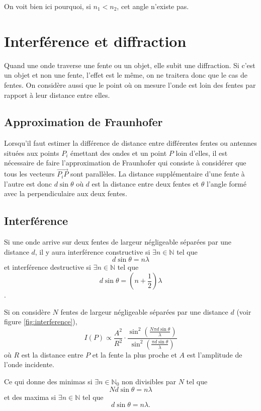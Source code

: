 On voit bien ici pourquoi, si $n_1 < n_2$, cet angle n'existe pas.

\section{Interférence et diffraction}
Quand une onde traverse une fente ou un objet, elle subit une diffraction.
Si c'est un objet et non une fente, l'effet est le même,
on ne traitera donc que le cas de fentes.
On considère aussi que le point où on mesure l'onde est loin des fentes
par rapport à leur distance entre elles.

\subsection{Approximation de Fraunhofer}
\label{sec:fraunhofer}
Lorsqu'il faut estimer la différence de distance entre différentes
fentes ou antennes situées aux points $P_i$ émettant des ondes
et un point $P$ loin d'elles,
il est nécessaire de faire l'approximation de Fraunhofer qui
consiste à considérer que tous les vecteurs $\vec{P_iP}$
sont parallèles.
La distance supplémentaire d'une fente à l'autre est donc $d\sin\theta$
où $d$ est la distance entre deux fentes et $\theta$ l'angle
formé avec la perpendiculaire aux deux fentes.

\subsection{Interférence}
Si une onde arrive sur deux fentes de largeur négligeable séparées par
une distance $d$,
il y aura interférence constructive si $\exists n \in \mathbb{N}$ tel que
\[ d\sin\theta = n \lambda \]
et interférence destructive si $\exists n \in \mathbb{N}$ tel que
\[ d\sin\theta = \left(n+\frac{1}{2}\right) \lambda \].

Si on considère $N$ fentes de largeur négligeable séparées par une
distance $d$ (voir figure \ref{fig:interference}),
\[ I(P) \propto \frac{A^2}{R^2} \cdot
  \frac{\sin^2\left(\frac{N \pi d \sin\theta}{\lambda}\right)}
{\sin^2\left(\frac{\pi d \sin\theta}{\lambda}\right)} \]
où $R$ est la distance entre $P$ et la fente la plus proche
et $A$ est l'amplitude de l'onde incidente.

Ce qui donne des minimas si
$\exists n \in \mathbb{N}_0$ non divisibles par $N$ tel que
\[ N d \sin \theta = n \lambda \]
et des maxima si $\exists n \in \mathbb{N}$ tel que
\[ d \sin \theta = n \lambda. \]

